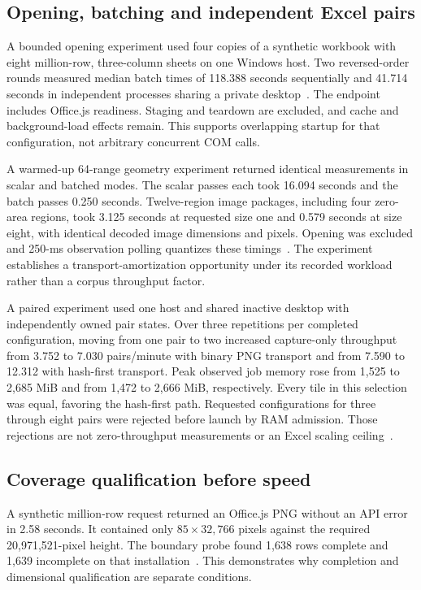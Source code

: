 \subsection{Opening, batching and independent Excel pairs}
A bounded opening experiment used four copies of a synthetic workbook with eight
million-row, three-column sheets on one Windows host. Two reversed-order rounds
measured median batch times of 118.388 seconds sequentially and 41.714 seconds
in independent processes sharing a private desktop~\cite{nativeopening}.
The endpoint includes Office.js readiness. Staging and teardown are excluded,
and cache and background-load effects remain. This supports overlapping startup
for that configuration, not arbitrary concurrent COM calls.

A warmed-up 64-range geometry experiment returned identical measurements in
scalar and batched modes. The scalar passes each took 16.094 seconds and the
batch passes 0.250 seconds. Twelve-region image packages, including four zero-area
regions, took 3.125 seconds at requested size one and 0.579 seconds at size eight,
with identical decoded image dimensions and pixels. Opening was excluded and
250-ms observation polling quantizes these timings~\cite{capturebatching}.
The experiment establishes a transport-amortization opportunity under its
recorded workload rather than a corpus throughput factor.

A paired experiment used one host and shared
inactive desktop with independently owned pair states. Over three repetitions
per completed configuration, moving from one pair to two increased capture-only
throughput from 3.752 to 7.030 pairs/minute with binary PNG transport and from
7.590 to 12.312 with hash-first transport. Peak observed job memory rose from
1,525 to 2,685 MiB and from 1,472 to 2,666 MiB, respectively. Every tile in this
selection was equal, favoring the hash-first path. Requested configurations
for three through eight pairs were rejected before launch by RAM admission.
Those rejections are not zero-throughput measurements or an Excel scaling
ceiling~\cite{pairdevelopment,pairstartupdevelopment}.

\subsection{Coverage qualification before speed}
A synthetic million-row request returned an Office.js PNG without an API error
in 2.58 seconds. It contained only $85\times32{,}766$ pixels against the required
20,971,521-pixel height. The boundary probe found 1,638 rows complete and 1,639
incomplete on that installation~\cite{imagelimitdevelopment}. This demonstrates
why completion and dimensional qualification are separate conditions.

